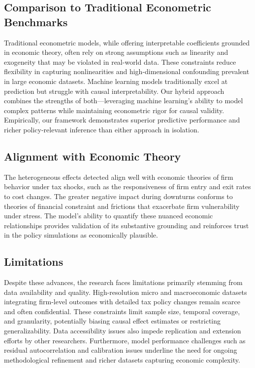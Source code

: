 \subsection{Comparison to Traditional Econometric Benchmarks}
Traditional econometric models, while offering interpretable coefficients grounded in economic theory, often rely on strong assumptions such as linearity and exogeneity that may be violated in real-world data. These constraints reduce flexibility in capturing nonlinearities and high-dimensional confounding prevalent in large economic datasets. Machine learning models traditionally excel at prediction but struggle with causal interpretability. Our hybrid approach combines the strengths of both—leveraging machine learning’s ability to model complex patterns while maintaining econometric rigor for causal validity. Empirically, our framework demonstrates superior predictive performance and richer policy-relevant inference than either approach in isolation.

\subsection{Alignment with Economic Theory}
The heterogeneous effects detected align well with economic theories of firm behavior under tax shocks, such as the responsiveness of firm entry and exit rates to cost changes. The greater negative impact during downturns conforms to theories of financial constraint and frictions that exacerbate firm vulnerability under stress. The model’s ability to quantify these nuanced economic relationships provides validation of its substantive grounding and reinforces trust in the policy simulations as economically plausible.

\subsection{Limitations}
Despite these advances, the research faces limitations primarily stemming from data availability and quality. High-resolution micro and macroeconomic datasets integrating firm-level outcomes with detailed tax policy changes remain scarce and often confidential. These constraints limit sample size, temporal coverage, and granularity, potentially biasing causal effect estimates or restricting generalizability. Data accessibility issues also impede replication and extension efforts by other researchers. Furthermore, model performance challenges such as residual autocorrelation and calibration issues underline the need for ongoing methodological refinement and richer datasets capturing economic complexity.

